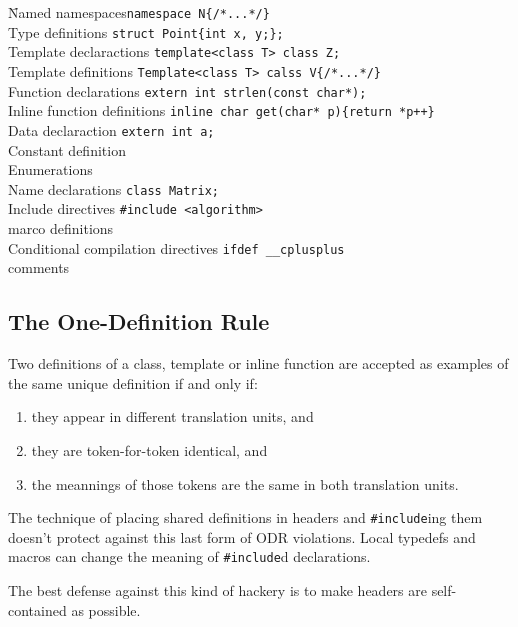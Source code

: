 \documentclass[11pt, a4paper]{book}
\begin{document}
\begin{tabbing}
\hspace{1cm}\= Named namespaces\hspace{3cm}\quad\= \verb|namespace N{/*...*/}|\\
	\>Type definitions \>\verb|struct Point{int x, y;};|\\
	\>Template declaractions \>\verb|template<class T> class Z;|\\
	\>Template definitions \>\verb|Template<class T> calss V{/*...*/}|\\
	\>Function declarations \>\verb|extern int strlen(const char*);|\\
	\>Inline function definitions \>\verb|inline char get(char* p){return *p++}|\\
	\>Data declaraction \>\verb|extern int a;|\\
	\>Constant definition\\
	\>Enumerations\\
	\>Name declarations \>\verb|class Matrix;|\\
	\>Include directives \>\verb|#include <algorithm>|\\
	\>marco definitions\\
	\>Conditional compilation directives \>\verb|ifdef __cplusplus|\\
	\>comments\\


\end{tabbing}

\subsection{The One-Definition Rule}
Two definitions of a class, template or inline function are accepted as examples of the same unique definition if and only if:
\begin{enumerate}
\item they appear in different translation units, and
\item they are token-for-token identical, and
\item the meannings of those tokens are the same in both translation units.
\end{enumerate}
The technique of placing shared definitions in headers and \verb|#include|ing them doesn't protect against this last form of ODR violations. Local typedefs and macros can change the meaning of \verb|#include|d declarations.

The best defense against this kind of hackery is to make headers are self-contained as possible.
\end{document}
